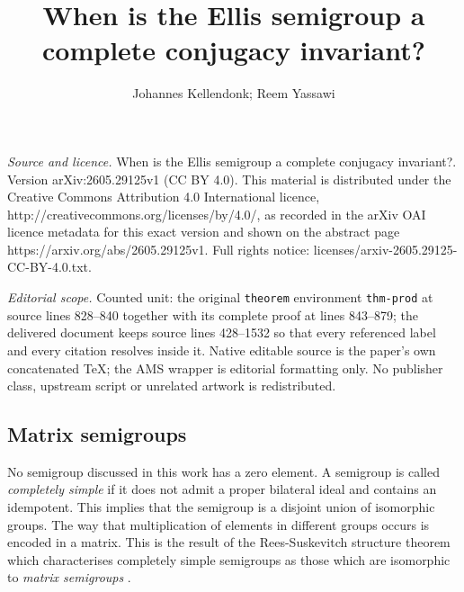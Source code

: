 \documentclass[10pt,a4paper]{amsart}
\numberwithin{equation}{section}
\begin{document}
\title[When is the Ellis semigroup a complete conjugacy invariant?]{When is the Ellis semigroup a complete conjugacy invariant?}
\author{Johannes Kellendonk; Reem Yassawi}
\date{}
\maketitle
\noindent\emph{Source and licence.} When is the Ellis semigroup a complete conjugacy invariant?. Version arXiv:2605.29125v1 (CC BY 4.0). This material is distributed under the Creative Commons Attribution 4.0 International licence, http://creativecommons.org/licenses/by/4.0/, as recorded in the arXiv OAI licence metadata for this exact version and shown on the abstract page https://arxiv.org/abs/2605.29125v1. Full rights notice: licenses/arxiv-2605.29125-CC-BY-4.0.txt.\par\smallskip
\noindent\textit{Editorial scope.} Counted unit: the original \texttt{theorem} environment \texttt{thm-prod} at source lines 828--840 together with its complete proof at lines 843--879; the delivered document keeps source lines 428--1532 so that every referenced label and every citation resolves inside it. Native editable source is the paper's own concatenated TeX; the AMS wrapper is editorial formatting only. No publisher class, upstream script or unrelated artwork is redistributed.
\subsection{Matrix semigroups}\label{sec:matrix-semigroups} No semigroup discussed in this work has a zero element. 
A semigroup is called \emph{completely simple} if it does not admit a proper bilateral ideal and contains an idempotent. This implies that the semigroup is a disjoint union of isomorphic groups. The way that multiplication of  elements in different groups occurs is  encoded in a matrix. This is the result of the 
Rees-Suskevitch structure theorem which characterises completely simple semigroups as those which are isomorphic to {\em matrix semigroups} \cite{howie1995fundamentals}.   
\end{document}
